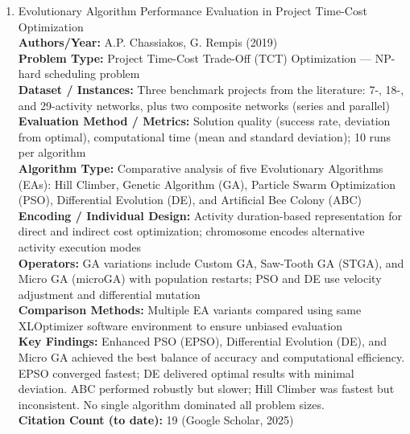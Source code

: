 \documentclass[a4paper,12pt]{article}
\begin{document}
\begin{enumerate}[leftmargin=2em, labelwidth=1em, labelsep=0.5em, itemsep=1ex]
  \item Evolutionary Algorithm Performance Evaluation in Project Time-Cost Optimization \\
    \textbf{Authors/Year:} A.P. Chassiakos, G. Rempis (2019) \\  
    \textbf{Problem Type:} Project Time-Cost Trade-Off (TCT) Optimization — NP-hard scheduling problem \\  
    \textbf{Dataset / Instances:} Three benchmark projects from the literature: 7-, 18-, and 29-activity networks, plus two composite networks (series and parallel) \\  
    \textbf{Evaluation Method / Metrics:} Solution quality (success rate, deviation from optimal), computational time (mean and standard deviation); 10 runs per algorithm \\  
    \textbf{Algorithm Type:} Comparative analysis of five Evolutionary Algorithms (EAs): Hill Climber, Genetic Algorithm (GA), Particle Swarm Optimization (PSO), Differential Evolution (DE), and Artificial Bee Colony (ABC) \\  
    \textbf{Encoding / Individual Design:} Activity duration-based representation for direct and indirect cost optimization; chromosome encodes alternative activity execution modes \\  
    \textbf{Operators:} GA variations include Custom GA, Saw-Tooth GA (STGA), and Micro GA (microGA) with population restarts; PSO and DE use velocity adjustment and differential mutation \\  
    \textbf{Comparison Methods:} Multiple EA variants compared using same XLOptimizer software environment to ensure unbiased evaluation \\  
    \textbf{Key Findings:} Enhanced PSO (EPSO), Differential Evolution (DE), and Micro GA achieved the best balance of accuracy and computational efficiency. EPSO converged fastest; DE delivered optimal results with minimal deviation. ABC performed robustly but slower; Hill Climber was fastest but inconsistent. No single algorithm dominated all problem sizes. \\  
    \textbf{Citation Count (to date):} 19 (Google Scholar, 2025) \\[2ex]
  
\end{enumerate}
\end{document}
